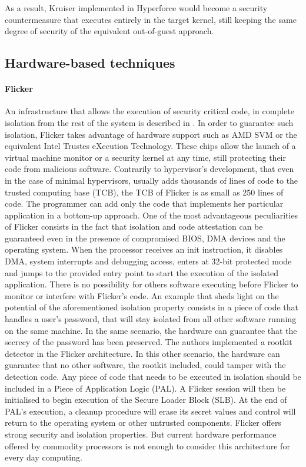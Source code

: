 As a result, Kruiser implemented in Hyperforce would become a security countermeasure that executes entirely in the target kernel, still keeping the same degree of security of the equivalent out-of-guest approach.


\subsection{Hardware-based techniques} \label{hwbased}
\paragraph{Flicker}
An infrastructure that allows the execution of security critical code, in complete isolation from the rest of the system is described in \cite{flicker}. In order to guarantee such isolation, Flicker takes advantage of hardware support such as AMD SVM or the equivalent Intel Trustes eXecution Technology. These chips allow the launch of a virtual machine monitor or a security kernel at any time, still protecting their code from malicious software.
Contrarily to hypervisor's development, that even in the case of minimal hypervisors, usually adds thousands of lines of code to the trusted computing base (TCB), the TCB of Flicker is as small as 250 lines of code. The programmer can add only the code that implements her particular application in a bottom-up approach. 
One of the most advantageous peculiarities of Flicker consists in the fact that isolation and code attestation can be guaranteed even in the presence of compromised BIOS, DMA devices and the operating system. 
When the processor receives an init instruction, it disables DMA, system interrupts and debugging access, enters at 32-bit protected mode and jumps to the provided entry point to start the execution of the isolated application.
There is no possibility for others software executing before Flicker to monitor or interfere with Flicker's code.
An example that sheds light on the potential of the aforementioned isolation property consists in a piece of code that handles a user's password, that will stay isolated from all other software running on the same machine. In the same scenario, the hardware can guarantee that the secrecy of the password has been preserved.  
The authors implemented a rootkit detector in the Flicker architecture. In this other scenario, the hardware can guarantee that no other software, the rootkit included, could tamper with the detection code. 
Any piece of code that needs to be executed in isolation should be included in a Piece of Application Logic (PAL). A Flicker session will then be initialised to begin execution of the Secure Loader Block (SLB). At the end of PAL's execution, a cleanup procedure will erase its secret values and control will return to the operating system or other untrusted components. 
Flicker offers strong security and isolation properties. But current hardware performance offered by commodity processors is not enough to consider this architecture for every day computing. 



